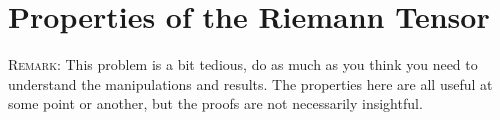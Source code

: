 \documentclass[12pt]{article}
\numberwithin{equation}{section}    %
\begin{document}
%
%
%

\section{Properties of the Riemann Tensor}

\textsc{Remark}: This problem is a bit tedious, do as much as you think you need to understand the manipulations and results. The properties here are all useful at some point or another, but the proofs are not necessarily insightful.
\end{document}
